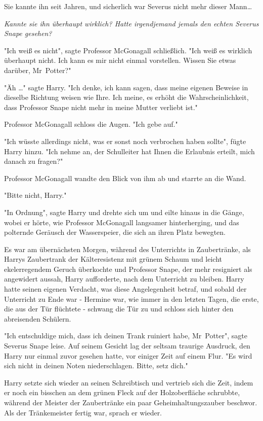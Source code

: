 {Sie kannte ihn seit Jahren, und sicherlich war Severus nicht mehr dieser Mann…

\emph{Kannte sie ihn überhaupt wirklich? Hatte irgendjemand jemals den echten Severus Snape gesehen?}

"Ich weiß es nicht", sagte Professor McGonagall schließlich. "Ich weiß es wirklich überhaupt nicht. Ich kann es mir nicht einmal vorstellen. Wissen Sie etwas darüber, Mr~Potter?"

"Äh …" sagte Harry. "Ich denke, ich kann sagen, dass meine eigenen Beweise in dieselbe Richtung weisen wie Ihre. Ich meine, es erhöht die Wahrscheinlichkeit, dass Professor Snape nicht mehr in meine Mutter verliebt ist."

Professor McGonagall schloss die Augen. "Ich gebe auf."

"Ich wüsste allerdings nicht, was er sonst noch verbrochen haben sollte", fügte Harry hinzu. "Ich nehme an, der Schulleiter hat Ihnen die Erlaubnis erteilt, mich danach zu fragen?"

Professor McGonagall wandte den Blick von ihm ab und starrte an die Wand.

"Bitte nicht, Harry."

"In Ordnung", sagte Harry und drehte sich um und eilte hinaus in die Gänge, wobei er hörte, wie Professor McGonagall langsamer hinterherging, und das polternde Geräusch der Wasserspeier, die sich an ihren Platz bewegten.

Es war am übernächsten Morgen, während des Unterrichts in Zaubertränke, als Harrys Zaubertrank der Kälteresistenz mit grünem Schaum und leicht ekelerregendem Geruch überkochte und Professor Snape, der mehr resigniert als angewidert aussah, Harry aufforderte, nach dem Unterricht zu bleiben. Harry hatte seinen eigenen Verdacht, was diese Angelegenheit betraf, und sobald der Unterricht zu Ende war - Hermine war, wie immer in den letzten Tagen, die erste, die aus der Tür flüchtete - schwang die Tür zu und schloss sich hinter den abreisenden Schülern.

"Ich entschuldige mich, dass ich deinen Trank ruiniert habe, Mr~Potter", sagte Severus Snape leise. Auf seinem Gesicht lag der seltsam traurige Ausdruck, den Harry nur einmal zuvor gesehen hatte, vor einiger Zeit auf einem Flur. "Es wird sich nicht in deinen Noten niederschlagen. Bitte, setz dich."

Harry setzte sich wieder an seinen Schreibtisch und vertrieb sich die Zeit, indem er noch ein bisschen an dem grünen Fleck auf der Holzoberfläche schrubbte, während der Meister der Zaubertränke ein paar Geheimhaltungszauber beschwor. Als der Tränkemeister fertig war, sprach er wieder.

}
